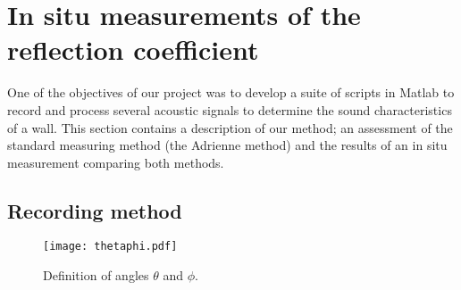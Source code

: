 \begin{comment}
\documentclass[12pt,a4paper]{article}
\usepackage{a4wide}
\usepackage{amsfonts, amsmath, amsthm}
\usepackage[english]{babel}
\usepackage{framed}
\usepackage[pdftex]{graphicx}
\usepackage{epstopdf}
\usepackage[font=small,format=plain,labelfont=bf,up,textfont=it,up]{caption}
\usepackage{wrapfig}
\usepackage{tocloft}
\usepackage{psfrag}
\usepackage{subfig}
\usepackage[latin1]{inputenc}
\usepackage{verbatim}

\usepackage{bbm}
\topmargin -15mm
\textwidth 16truecm
\textheight 24truecm
\setlength\parindent{0pt}
\setlength\parskip{0.20in plus0.05in minus0.05in}
\newcommand{\Z}{\mathbb{Z}}
\newcommand{\N}{\mathbb{N}}
\newcommand{\R}{\mathbb{R}}
\newcommand{\C}{\mathbb{C}}
\newcommand{\eps}{\varepsilon}
\fboxrule 1pt
\fboxsep 7pt
\pagenumbering{arabic}







\end{comment}


\section{In situ measurements of the reflection coefficient}
One of the objectives of our project was to develop a suite of scripts in Matlab to record and process several acoustic signals to determine the sound characteristics of a wall. 
This section contains a description of our method; an assessment of the standard measuring method (the Adrienne method) and the results of an in situ measurement comparing both methods. 

\subsection{Recording method}

\begin{wrapfigure}{r}[0.08\textwidth]{0.2\textwidth}
  \centering
    \texttt{[image: thetaphi.pdf]}
  \caption{Definition of angles $\theta$ and $\phi$.}
  \label{fig: thetaphi}
\end{wrapfigure}


